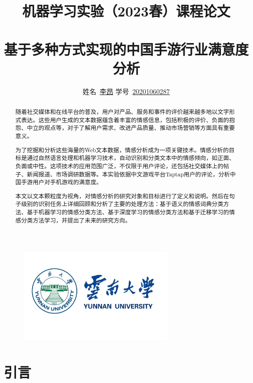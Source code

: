 \documentclass[hyperref,a4paper,UTF8]{ctexart}
\title{
机器学习实验（2023春）课程论文\\
~\\
\textbf{基于多种方式实现的中国手游行业满意度分析}
}
\author{
\kaishu\normalsize
姓名\ \underline{李昂} \qquad
学号\ \underline{20201060287} \qquad
}
\date{} %
\begin{document}
\begin{figure}
    \centering
    \includegraphics[width=0.7\textwidth]{fig/ynu.jpg}
\end{figure}

\maketitle



\begin{abstract}
随着社交媒体和在线平台的普及，用户对产品、服务和事件的评价越来越多地以文字形式表达。这些用户生成的文本数据蕴含着丰富的情感信息，包括积极的评价、负面的抱怨、中立的观点等，对于了解用户需求、改进产品质量、推动市场营销等方面具有重要意义。


为了挖掘和分析这些海量的Web文本数据，情感分析成为一项关键技术。情感分析的目标是通过自然语言处理和机器学习技术，自动识别和分类文本中的情感倾向，如正面、负面或中性。这项技术的应用范围广泛，不仅限于用户评论，还包括社交媒体上的帖子、新闻报道、市场调研数据等。本实验依据中文游戏平台Taptap用户的评论，分析中国手游用户对手机游戏的满意度。


本文以文本颗粒度为视角，对情感分析的研究对象和目标进行了定义和说明。然后在句子级别的识别任务上详细回顾和分析了主要的处理方法：基于语义的情感词典分类方法、基于机器学习的情感分类方法、基于深度学习的情感分类方法和基于迁移学习的情感分类方法学习，并提出了未来的研究方向。

\end{abstract}
\thispagestyle{empty} %

\newpage

\tableofcontents
\thispagestyle{empty} %

\newpage

\listoffigures
\listoftables


\thispagestyle{empty} %
\newpage


\section{引言}
\end{document}
